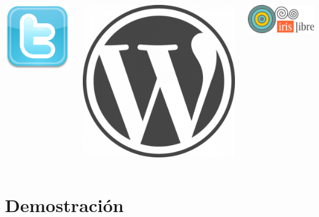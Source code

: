 \documentclass[green]{beamer}
\begin{document}
\begin{frame}
\begin{columns}[t]
    \begin{center}
	    \includegraphics[scale=0.25]{img/twitter.png}
    \end{center}
    \begin{center}
	    \includegraphics[scale=0.13]{img/blog.png}
    \end{center}
    \begin{center}
	    \includegraphics[scale=0.5]{img/rediris.png}
    \end{center}
	
    \end{columns} 
\end{frame}

\section{Demostración}
\end{document}
